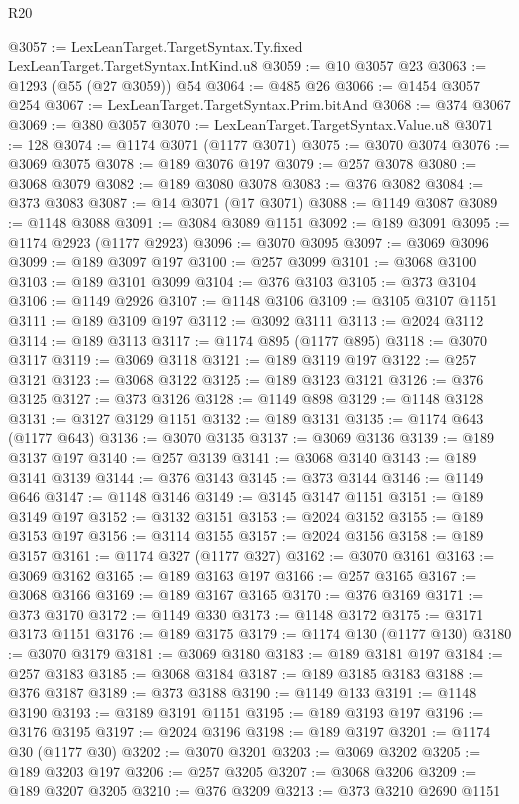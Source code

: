 \begin{lexlean}{R20}
\begin{coremodule}
@3057 := LexLeanTarget.TargetSyntax.Ty.fixed LexLeanTarget.TargetSyntax.IntKind.u8
@3059 := @10 @3057 @23
@3063 := @1293 (@55 (@27 @3059)) @54
@3064 := @485 @26
@3066 := @1454 @3057 @254
@3067 := LexLeanTarget.TargetSyntax.Prim.bitAnd
@3068 := @374 @3067
@3069 := @380 @3057
@3070 := LexLeanTarget.TargetSyntax.Value.u8
@3071 := 128
@3074 := @1174 @3071 (@1177 @3071)
@3075 := @3070 @3074
@3076 := @3069 @3075
@3078 := @189 @3076 @197
@3079 := @257 @3078
@3080 := @3068 @3079
@3082 := @189 @3080 @3078
@3083 := @376 @3082
@3084 := @373 @3083
@3087 := @14 @3071 (@17 @3071)
@3088 := @1149 @3087
@3089 := @1148 @3088
@3091 := @3084 @3089 @1151
@3092 := @189 @3091
@3095 := @1174 @2923 (@1177 @2923)
@3096 := @3070 @3095
@3097 := @3069 @3096
@3099 := @189 @3097 @197
@3100 := @257 @3099
@3101 := @3068 @3100
@3103 := @189 @3101 @3099
@3104 := @376 @3103
@3105 := @373 @3104
@3106 := @1149 @2926
@3107 := @1148 @3106
@3109 := @3105 @3107 @1151
@3111 := @189 @3109 @197
@3112 := @3092 @3111
@3113 := @2024 @3112
@3114 := @189 @3113
@3117 := @1174 @895 (@1177 @895)
@3118 := @3070 @3117
@3119 := @3069 @3118
@3121 := @189 @3119 @197
@3122 := @257 @3121
@3123 := @3068 @3122
@3125 := @189 @3123 @3121
@3126 := @376 @3125
@3127 := @373 @3126
@3128 := @1149 @898
@3129 := @1148 @3128
@3131 := @3127 @3129 @1151
@3132 := @189 @3131
@3135 := @1174 @643 (@1177 @643)
@3136 := @3070 @3135
@3137 := @3069 @3136
@3139 := @189 @3137 @197
@3140 := @257 @3139
@3141 := @3068 @3140
@3143 := @189 @3141 @3139
@3144 := @376 @3143
@3145 := @373 @3144
@3146 := @1149 @646
@3147 := @1148 @3146
@3149 := @3145 @3147 @1151
@3151 := @189 @3149 @197
@3152 := @3132 @3151
@3153 := @2024 @3152
@3155 := @189 @3153 @197
@3156 := @3114 @3155
@3157 := @2024 @3156
@3158 := @189 @3157
@3161 := @1174 @327 (@1177 @327)
@3162 := @3070 @3161
@3163 := @3069 @3162
@3165 := @189 @3163 @197
@3166 := @257 @3165
@3167 := @3068 @3166
@3169 := @189 @3167 @3165
@3170 := @376 @3169
@3171 := @373 @3170
@3172 := @1149 @330
@3173 := @1148 @3172
@3175 := @3171 @3173 @1151
@3176 := @189 @3175
@3179 := @1174 @130 (@1177 @130)
@3180 := @3070 @3179
@3181 := @3069 @3180
@3183 := @189 @3181 @197
@3184 := @257 @3183
@3185 := @3068 @3184
@3187 := @189 @3185 @3183
@3188 := @376 @3187
@3189 := @373 @3188
@3190 := @1149 @133
@3191 := @1148 @3190
@3193 := @3189 @3191 @1151
@3195 := @189 @3193 @197
@3196 := @3176 @3195
@3197 := @2024 @3196
@3198 := @189 @3197
@3201 := @1174 @30 (@1177 @30)
@3202 := @3070 @3201
@3203 := @3069 @3202
@3205 := @189 @3203 @197
@3206 := @257 @3205
@3207 := @3068 @3206
@3209 := @189 @3207 @3205
@3210 := @376 @3209
@3213 := @373 @3210 @2690 @1151

\end{coremodule}
\end{lexlean}
